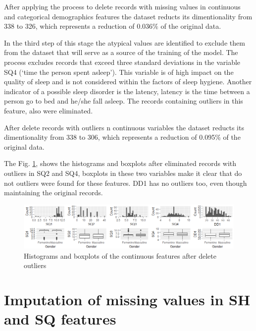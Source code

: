 \documentclass[]{book}
\begin{document}
After applying the process to delete records with missing values in
continuous and categorical demographics features the dataset reducts its
dimentionality from 338 to 326, which represents a reduction of 0.036\%
of the original data.

In the third step of this stage the atypical values are identified to
exclude them from the dataset that will serve as a source of the
training of the model. The process excludes records that exceed three
standard deviations in the variable SQ4 (`time the person spent
asleep'). This variable is of high impact on the quality of sleep and is
not considered within the factors of sleep hygiene. Another indicator of
a possible sleep disorder is the latency, latency is the time between a
person go to bed and he/she fall asleep. The records containing outliers
in this feature, also were eliminated.

After delete records with outliers n continuous variables the dataset
reducts its dimentionality from 338 to 306, which represents a reduction
of 0.095\% of the original data.

The Fig. \ref{fig:hb-of-cf-after-deloutliers}, shows the histograms and
boxplots after eliminated records with outliers in SQ2 and SQ4, boxplots
in these two variables make it clear that do not outliers were found for
these features. DD1 has no outliers too, even though maintaining the
original records.

\begin{figure}[H]

{\centering \includegraphics[width=0.9\linewidth]{images/hist-boxplots-continuous-variables-after-delete-outliers} 

}

\caption{Histograms and boxplots of the continuous features after delete outliers}\label{fig:hb-of-cf-after-deloutliers}
\end{figure}

\section{Imputation of missing values in SH and SQ
features}\label{imputation-of-missing-values-in-sh-and-sq-features}
\end{document}
